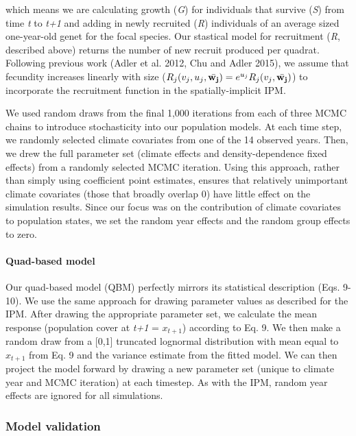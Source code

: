 \documentclass[12pt,]{article}
\begin{document}
which means we are calculating growth (\emph{G}) for individuals that
survive (\emph{S}) from time \emph{t} to \emph{t+1} and adding in newly
recruited (\emph{R}) individuals of an average sized one-year-old genet
for the focal species. Our stastical model for recruitment (\emph{R},
described above) returns the number of new recruit produced per quadrat.
Following previous work (Adler et al. 2012, Chu and Adler 2015), we
assume that fecundity increases linearly with size
($R_j(v_{j},u_{j},\bar{\bold{w_{j}}}) = e^{u_j}R_j(v_{j},\bar{\bold{w_{j}}})$)
to incorporate the recruitment function in the spatially-implicit IPM.

We used random draws from the final 1,000 iterations from each of three
MCMC chains to introduce stochasticity into our population models. At
each time step, we randomly selected climate covariates from one of the
14 observed years. Then, we drew the full parameter set (climate effects
and density-dependence fixed effects) from a randomly selected MCMC
iteration. Using this approach, rather than simply using coefficient
point estimates, ensures that relatively unimportant climate covariates
(those that broadly overlap 0) have little effect on the simulation
results. Since our focus was on the contribution of climate covariates
to population states, we set the random year effects and the random
group effects to zero.

\paragraph{Quad-based model}\label{quad-based-model}

Our quad-based model (QBM) perfectly mirrors its statistical description
(Eqs. 9-10). We use the same approach for drawing parameter values as
described for the IPM. After drawing the appropriate parameter set, we
calculate the mean response (population cover at \emph{t+1} = $x_{t+1}$)
according to Eq. 9. We then make a random draw from a {[}0,1{]}
truncated lognormal distribution with mean equal to $x_{t+1}$ from Eq. 9
and the variance estimate from the fitted model. We can then project the
model forward by drawing a new parameter set (unique to climate year and
MCMC iteration) at each timestep. As with the IPM, random year effects
are ignored for all simulations.

\subsubsection{Model validation}\label{model-validation}
\end{document}
